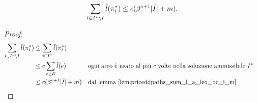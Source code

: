 \begin{corollario}\label{cor:priceddpaths_cor_2}
	\begin{equation*}
		\sum_{i\in I^*\setminus I} \bar l(\pi^*_i) \leq c(\beta^{c+1}| \bar I |+m) \text.
	\end{equation*}
\end{corollario}
\begin{proof}
	\begin{align*}
		\sum_{i\in I^*\setminus I} \bar l(\pi^*_i) & \leq \sum_{i\in I^*} \bar l(\pi^*_i)                                                                                     \\
		                                                 & \leq c \sum_{e\in E} \bar l(e)             &  & \text{ogni arco è usato al più $c$ volte nella soluzione ammissibile $I^*$} \\
		                                                 & \leq c (\beta^{c+1}| \bar I |+m)        &  & \text{dal lemma \ref{lem:priceddpaths_sum_l_a_leq_bc_i_m}}
	\end{align*}
\end{proof}

